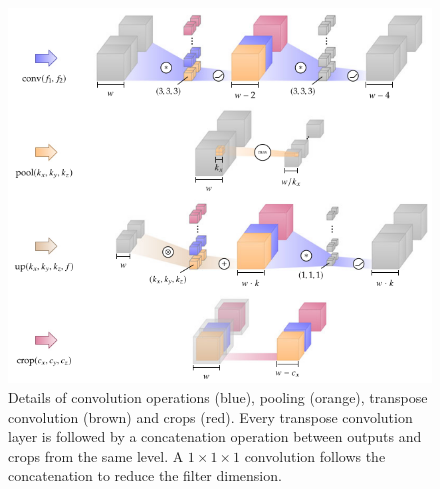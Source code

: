 \begin{figure}[!htbp]
	\centering
	\includegraphics[width=0.8\linewidth]{./images/architecture_details.png}
	\caption{Details of convolution operations (blue), pooling (orange), transpose convolution (brown) and crops (red). Every transpose convolution layer is followed by a concatenation operation between outputs and crops from the same level.  A $1\times1\times1$ convolution follows the concatenation to reduce the filter dimension.}%
	\label{fig:mala_unet}
\end{figure}


